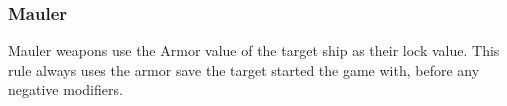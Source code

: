 \subsubsection{Mauler}
Mauler weapons use the Armor value of the target ship as their lock value. This rule always uses the armor save the target started the game with, before any negative modifiers.